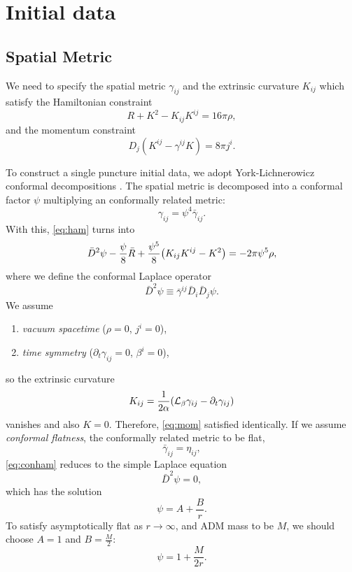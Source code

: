 \documentclass[%
 reprint,
 amsmath,amssymb,
 aps,
 prd,
]{revtex4-2}
\begin{document}
\section{Initial data}
\subsection{Spatial Metric}
We need to specify the spatial metric $\gamma_{ij}$ and the extrinsic curvature $K_{ij}$ which satisfy the Hamiltonian constraint
\begin{equation}
	\label{eq:ham}
	R + K^2 - K_{ij}K^{ij} = 16 \pi \rho,
\end{equation}
and the momentum constraint
\begin{equation}
	\label{eq:mom}
	D_j(K^{ij} - \gamma^{ij}K) = 8\pi j^i.
\end{equation}

To construct a single puncture initial data, we adopt York-Lichnerowicz conformal decompositions \cite{PhysRevLett.26.1656, Lichnerowicz:1944zz}. The spatial metric is decomposed into a conformal factor $\psi$ multiplying an conformally related metric:
\begin{equation}
	\label{eq:conformalmetric}
	\gamma_{ij} = \psi^4 \bar{\gamma}_{ij}.
\end{equation}
With this, \eqref{eq:ham} turns into
\begin{equation}
	\label{eq:conham}
	\bar{D}^2\psi - \frac{\psi}{8}\bar{R}+\frac{\psi^5}{8}\qty(K_{ij}K^{ij}-K^2)=-2\pi \psi^5 \rho,
\end{equation}
where we define the conformal Laplace operator
\begin{equation}
	\bar{D}^2\psi \equiv \bar{\gamma}^{ij}\bar{D}_i\bar{D}_j \psi.
\end{equation}
We assume
\begin{enumerate}[1)]
	\item \textit{vacuum spacetime} ($\rho = 0$, $j^i = 0$),
	\item \textit{time symmetry} ($\partial_t \gamma_{ij} = 0$, $\beta^i = 0$),
\end{enumerate}
so the extrinsic curvature
\begin{equation}
	K_{ij} = \frac{1}{2\alpha}\qty(\mathcal{L}_\beta \gamma_{ij} - \partial_t \gamma_{ij})
\end{equation}
vanishes and also $K=0$. Therefore, \eqref{eq:mom} satisfied identically. If we assume \textit{conformal flatness}, the conformally related metric to be flat,
\begin{equation}
	\bar{\gamma}_{ij} = \eta_{ij},
\end{equation}
\eqref{eq:conham} reduces to the simple Laplace equation
\begin{equation}
	\bar{D}^2\psi = 0,
\end{equation}
which has the solution
\begin{equation}
	\psi = A + \frac{B}{r}.
\end{equation}
To satisfy asymptotically flat as $r\to \infty$, and ADM mass to be $M$, we should choose $A=1$ and $B=\frac{M}{2}$:
\begin{equation}
	\label{eq:psi}
	\psi = 1 + \frac{M}{2r}.
\end{equation}
\end{document}

